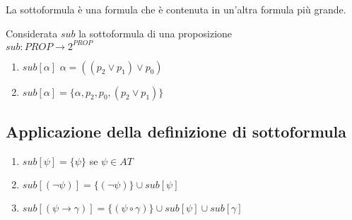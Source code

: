 \documentclass{article}
\theoremstyle{break}
\theoremstyle{break}
\theoremstyle{break}
\theoremstyle{break}
\begin{document}
La sottoformula è una formula che è contenuta in un'altra formula più grande.
\begin{definition}
  Considerata \( sub \) la sottoformula di una proposizione\\
  \( sub: PROP \to 2^{PROP} \)
  \begin{enumerate}
    \item \( sub[\alpha] \) \( \alpha = ((p_{2} \vee p_{1}) \vee p_{0} ) \)
    \item \( sub[\alpha] = \{\alpha, p_2, p_0, (p_2 \vee p_1)\} \)
  \end{enumerate}
\end{definition}

\subsection{Applicazione della definizione di sottoformula}
\begin{enumerate}
  \item \( sub[\psi] = \{ \psi \} \) se \( \psi \in AT \)
  \item \( sub[(\neg \psi)] = \{ (\neg \psi) \} \cup sub[\psi] \)
  \item \( sub[(\psi \to \gamma)] = \{(\psi \circ \gamma)\} \cup sub[\psi] \cup sub[\gamma] \)
\end{enumerate}
\end{document}
